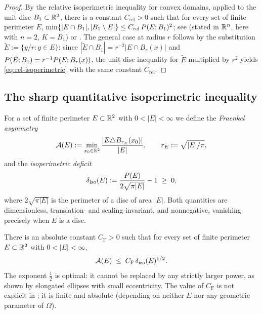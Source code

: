 \begin{proof}
By the relative isoperimetric inequality for convex domains, applied to the unit
disc $B_1\subset\mathbb{R}^2$, there is a constant $C_{\mathrm{rel}}>0$ such that for
every set of finite perimeter $E$,
$\min\{|E\cap B_1|, |B_1\setminus E|\} \le C_{\mathrm{rel}}\,P(E;B_1)^2$;
see \cite[Theorem~12.37]{Maggi2012} (stated in $\mathbb{R}^n$, here with $n=2$,
$K=B_1$) or \cite[Theorem~5.9]{EvansGariepy2015}.  The general case at radius
$r$ follows by the substitution $\tilde{E}:=\{y/r:y\in E\}$: since
$|\tilde{E}\cap B_1| = r^{-2}|E\cap B_r(x)|$ and
$P(\tilde{E};B_1) = r^{-1}P(E;B_r(x))$, the unit-disc inequality for
$\tilde{E}$ multiplied by $r^2$ yields \eqref{eq:rel-isoperimetric} with the
same constant $C_{\mathrm{rel}}$.
\end{proof}

\subsection{The sharp quantitative isoperimetric inequality}

For a set of finite perimeter $E\subset\mathbb{R}^2$ with $0<|E|<\infty$ we define the
\emph{Fraenkel asymmetry}
\begin{equation}\label{eq:fraenkel}
  \mathcal{A}(E) := \min_{x_0\in\mathbb{R}^2}\frac{|E\triangle B_{r_E}(x_0)|}{|E|},
  \qquad r_E := \sqrt{|E|/\pi},
\end{equation}
and the \emph{isoperimetric deficit}
\begin{equation}\label{eq:iso-deficit}
  \delta_{\mathrm{iso}}(E) := \frac{P(E)}{2\sqrt{\pi|E|}}-1 \;\ge\; 0,
\end{equation}
where $2\sqrt{\pi|E|}$ is the perimeter of a disc of area $|E|$.  Both
quantities are dimensionless, translation- and scaling-invariant, and
nonnegative, vanishing precisely when $E$ is a disc.

\begin{theorem}\label{thm:fmp}
There is an absolute constant $C_{\mathrm{F}}>0$ such that for every set of
finite perimeter $E\subset\mathbb{R}^2$ with $0<|E|<\infty$,
\begin{equation}\label{eq:fmp}
  \mathcal{A}(E) \;\le\; C_{\mathrm{F}}\,\delta_{\mathrm{iso}}(E)^{1/2}.
\end{equation}
The exponent $\tfrac{1}{2}$ is optimal: it cannot be replaced by any strictly
larger power, as shown by elongated ellipses with small eccentricity.
The value of $C_{\mathrm{F}}$ is not explicit in \cite{FMP2008}; it is finite
and absolute (depending on neither $E$ nor any geometric parameter of $\Omega$).
\end{theorem}


